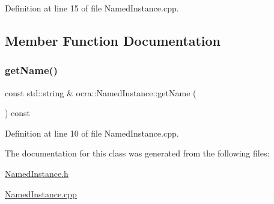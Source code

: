 Definition at line 15 of file Named\+Instance.\+cpp.



\subsection{Member Function Documentation}
\hypertarget{classocra_1_1NamedInstance_a8ef1a2cbd11f1308774eff3f61c53ae1}{}\label{classocra_1_1NamedInstance_a8ef1a2cbd11f1308774eff3f61c53ae1} 
\subsubsection{\texorpdfstring{get\+Name()}{getName()}}
{\footnotesize\ttfamily const std\+::string \& ocra\+::\+Named\+Instance\+::get\+Name (\begin{DoxyParamCaption}{ }\end{DoxyParamCaption}) const}



Definition at line 10 of file Named\+Instance.\+cpp.



The documentation for this class was generated from the following files\+:\begin{DoxyCompactItemize}
\item 
\hyperlink{NamedInstance_8h}{Named\+Instance.\+h}\item 
\hyperlink{NamedInstance_8cpp}{Named\+Instance.\+cpp}\end{DoxyCompactItemize}
